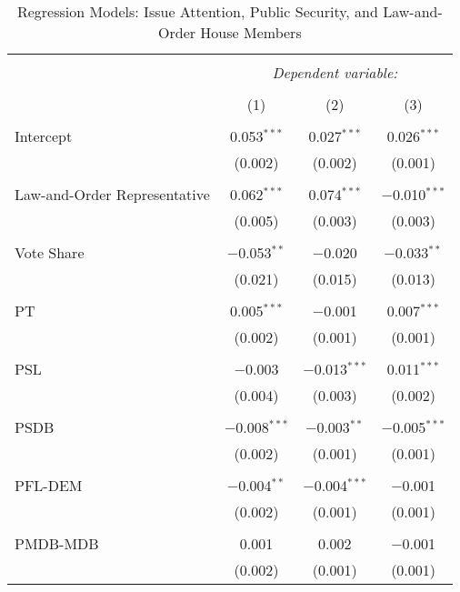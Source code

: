 
\begin{table}[!htbp] \centering 
  \caption{Regression Models: Issue Attention, Public Security, and Law-and-Order House Members} 
  \label{stm_reg} 
\begin{tabular}{@{\extracolsep{5pt}}lccc} 
\\[-1.8ex]\hline 
\hline \\[-1.8ex] 
 & \multicolumn{3}{c}{\textit{Dependent variable:}} \\ 
\cline{2-4} 
\\[-1.8ex] & (1) & (2) & (3)\\ 
\hline \\[-1.8ex] 
 Intercept & 0.053$^{***}$ & 0.027$^{***}$ & 0.026$^{***}$ \\ 
  & (0.002) & (0.002) & (0.001) \\ 
  & & & \\ 
 Law-and-Order Representative & 0.062$^{***}$ & 0.074$^{***}$ & $-$0.010$^{***}$ \\ 
  & (0.005) & (0.003) & (0.003) \\ 
  & & & \\ 
 Vote Share & $-$0.053$^{**}$ & $-$0.020 & $-$0.033$^{**}$ \\ 
  & (0.021) & (0.015) & (0.013) \\ 
  & & & \\ 
 PT & 0.005$^{***}$ & $-$0.001 & 0.007$^{***}$ \\ 
  & (0.002) & (0.001) & (0.001) \\ 
  & & & \\ 
 PSL & $-$0.003 & $-$0.013$^{***}$ & 0.011$^{***}$ \\ 
  & (0.004) & (0.003) & (0.002) \\ 
  & & & \\ 
 PSDB & $-$0.008$^{***}$ & $-$0.003$^{**}$ & $-$0.005$^{***}$ \\ 
  & (0.002) & (0.001) & (0.001) \\ 
  & & & \\ 
 PFL-DEM & $-$0.004$^{**}$ & $-$0.004$^{***}$ & $-$0.001 \\ 
  & (0.002) & (0.001) & (0.001) \\ 
  & & & \\ 
 PMDB-MDB & 0.001 & 0.002 & $-$0.001 \\ 
  & (0.002) & (0.001) & (0.001) \\ 

\end{tabular}
\end{table}
